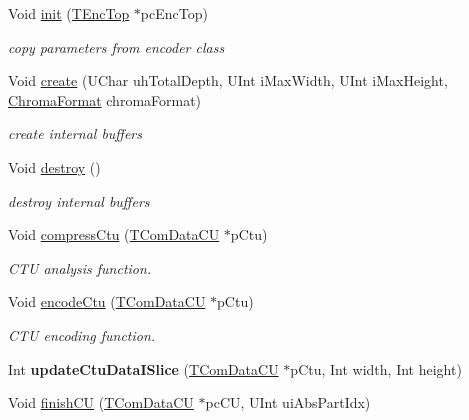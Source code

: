 \begin{DoxyCompactItemize}
\item 
Void \hyperlink{class_t_enc_cu_a83f153ad3f76e5e66bbcc9fcb6bc13fb}{init} (\hyperlink{class_t_enc_top}{T\+Enc\+Top} $\ast$pc\+Enc\+Top)
\begin{DoxyCompactList}\small\item\em copy parameters from encoder class \end{DoxyCompactList}\item 
Void \hyperlink{class_t_enc_cu_a74eba07dcd4d5ff00a468495f00df13b}{create} (U\+Char uh\+Total\+Depth, U\+Int i\+Max\+Width, U\+Int i\+Max\+Height, \hyperlink{_type_def_8h_a4a6c51c10f2eb04abc7209db7caff39f}{Chroma\+Format} chroma\+Format)
\begin{DoxyCompactList}\small\item\em create internal buffers \end{DoxyCompactList}\item 
\mbox{\label{class_t_enc_cu_a588c6b82ba2f16492655ddfd15d338d4}} 
Void \hyperlink{class_t_enc_cu_a588c6b82ba2f16492655ddfd15d338d4}{destroy} ()
\begin{DoxyCompactList}\small\item\em destroy internal buffers \end{DoxyCompactList}\item 
Void \hyperlink{class_t_enc_cu_ac1a4066045edd61e746102f565187a42}{compress\+Ctu} (\hyperlink{class_t_com_data_c_u}{T\+Com\+Data\+CU} $\ast$p\+Ctu)
\begin{DoxyCompactList}\small\item\em C\+TU analysis function. \end{DoxyCompactList}\item 
Void \hyperlink{class_t_enc_cu_af0b1c36fb5ec87c5bf26e3c5c4d5ab95}{encode\+Ctu} (\hyperlink{class_t_com_data_c_u}{T\+Com\+Data\+CU} $\ast$p\+Ctu)
\begin{DoxyCompactList}\small\item\em C\+TU encoding function. \end{DoxyCompactList}\item 
\mbox{\label{class_t_enc_cu_a8b31e2cb494d9779069a5cb5822d5943}} 
Int {\bfseries update\+Ctu\+Data\+I\+Slice} (\hyperlink{class_t_com_data_c_u}{T\+Com\+Data\+CU} $\ast$p\+Ctu, Int width, Int height)
\item 
Void \hyperlink{class_t_enc_cu_abc907e4a2fbfdb295d5f31616d28302a}{finish\+CU} (\hyperlink{class_t_com_data_c_u}{T\+Com\+Data\+CU} $\ast$pc\+CU, U\+Int ui\+Abs\+Part\+Idx)

\end{DoxyCompactItemize}
